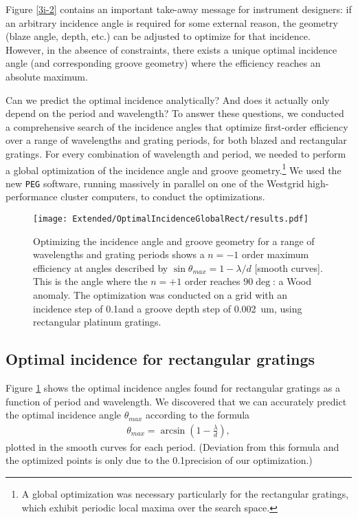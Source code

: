 Figure \ref{3i-2} contains an important take-away message for instrument designers: if an arbitrary incidence angle is required for some external reason, the geometry (blaze angle, depth, etc.) can be adjusted to optimize for that incidence. However, in the absence of constraints, there exists a unique optimal incidence angle (and corresponding groove geometry) where the efficiency reaches an absolute maximum.

Can we predict the optimal incidence analytically?  And does it actually only depend on the period and wavelength?  To answer these questions, we conducted a comprehensive search of the incidence angles that optimize first-order efficiency over a range of wavelengths and grating periods, for both blazed and rectangular gratings.  For every combination of wavelength and period, we needed to perform a global optimization of the incidence angle and groove geometry.\footnote{A global optimization was necessary particularly for the rectangular gratings, which exhibit periodic local maxima over the search space.}  We used the new \texttt{PEG} software, running massively in parallel on one of the Westgrid high-performance cluster computers, to conduct the optimizations.

\begin{figure}[htbp] %
   \centering
   \texttt{[image: Extended/OptimalIncidenceGlobalRect/results.pdf]} 
   \caption[Optimizing the incidence angle and groove geometry for a range of wavelengths and grating periods shows a $n=-1$ order maximum at the $n=+1$ order Wood anomaly: $\sin \theta_{max} = 1 - \lambda/d$.]{Optimizing the incidence angle and groove geometry for a range of wavelengths and grating periods shows a $n=-1$ order maximum efficiency at angles described by $\sin \theta_{max} = 1 - \lambda/d$ [smooth curves].  This is the angle where the $n=+1$ order reaches $90\deg$: a Wood anomaly.  The optimization was conducted on a grid with an incidence step of 0.1\dg and a groove depth step of 0.002~um, using rectangular platinum gratings.}
   \label{rectIncidenceOpt}
\end{figure}

\subsection{Optimal incidence for rectangular gratings}
Figure \ref{rectIncidenceOpt} shows the optimal incidence angles found for rectangular gratings as a function of period and wavelength.  We discovered that we can accurately predict the optimal incidence angle $\theta_{max}$ according to the formula
\begin{align}
\label{rectOptimalIncidence}
\theta_{max} = \arcsin \left( 1 - \frac{\lambda}{d} \right),
\end{align}
plotted in the smooth curves for each period.  (Deviation from this formula and the optimized points is only due to the 0.1\dg precision of our optimization.)

